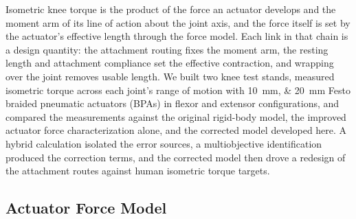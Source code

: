 \documentclass[utf8]{FrontiersinHarvard} %
\begin{document}
Isometric knee torque is the product of the force an actuator develops and the moment arm of its line of action about the joint axis, and the force itself is set by the actuator's effective length through the force model. Each link in that chain is a design quantity: the attachment routing fixes the moment arm, the resting length and attachment compliance set the effective contraction, and wrapping over the joint removes usable length. We built two knee test stands, measured isometric torque across each joint's range of motion with \qtylist{10;20}{\mm} Festo braided pneumatic actuators (BPAs) in flexor and extensor configurations, and compared the measurements against the original rigid-body model, the improved actuator force characterization alone, and the corrected model developed here. A hybrid calculation isolated the error sources, a multiobjective identification produced the correction terms, and the corrected model then drove a redesign of the attachment routes against human isometric torque targets.

\subsection{Actuator Force Model}\label{sec:force_model}
\end{document}
